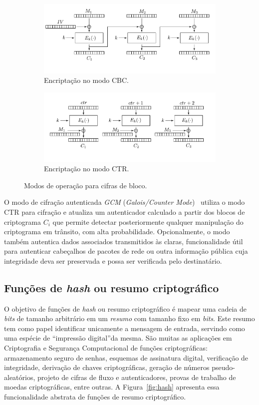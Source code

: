\begin{figure}[htbp]
\centering
\begin{subfigure}{\textwidth}
  \centering
  \includegraphics[width=.75\linewidth]{figures/cbc.pdf}
  \caption{Encriptação no modo CBC.}
  \label{fig:cbc}
\end{subfigure}
\begin{subfigure}{\textwidth}
  \centering
  \includegraphics[width=.75\linewidth]{figures/ctr.pdf}
  \caption{Encriptação no modo CTR.}
  \label{fig:ctr}
\end{subfigure}
\caption{Modos de operação para cifras de bloco.}
\label{fig:modos}
\end{figure}

O modo de cifração autenticada \emph{GCM} (\emph{Galois/Counter Mode})~\cite{McGrewV04} utiliza o modo CTR para cifração e atualiza um autenticador calculado a partir dos blocos de criptograma $C_i$ que permite detectar posteriormente qualquer manipulação do criptograma em trânsito, com alta probabilidade. Opcionalmente, o modo também autentica dados associados transmitidos às claras, funcionalidade útil para autenticar cabeçalhos de pacotes de rede ou outra informação pública cuja integridade deva ser preservada e possa ser verificada pelo destinatário.

\subsection{Funções de \emph{hash} ou resumo criptográfico}

O objetivo de funções de \emph{hash} ou resumo criptográfico é mapear uma cadeia de \emph{bits} de tamanho arbitrário em um \emph{resumo} com tamanho fixo em \emph{bits}. Este resumo tem como papel identificar unicamente a mensagem de entrada, servindo como uma espécie de ``impressão digital''da mesma. São muitas as aplicações em Criptografia e Segurança Computacional de funções criptográficas: armazenamento seguro de senhas, esquemas de assinatura digital, verificação de integridade, derivação de chaves criptográficas, geração de números pseudo-aleatórios, projeto de cifras de fluxo e autenticadores, provas de trabalho de moedas criptográficas, entre outras. A Figura~\ref{fig:hash} apresenta essa funcionalidade abstrata de funções de resumo criptográfico.

